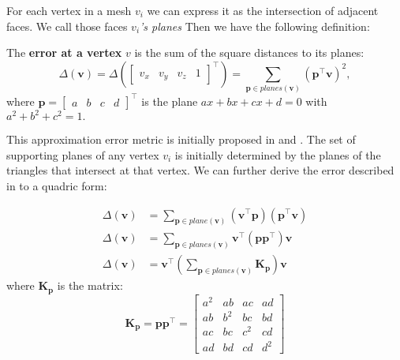 For each vertex in a mesh $v_i$ we can express it as the intersection of adjacent faces. We call those faces \emph{$v_i$'s planes} Then we have the following definition:
\begin{defn}
	The \textbf{error at a vertex} $v$ is the sum of the square distances to its planes:
	\begin{equation}
	\Delta(\textbf{v})=\Delta({\begin{bmatrix}v_x & v_y & v_z & 1\end{bmatrix}}^\intercal)=\sum_{\textbf{p}\in{planes(\textbf{v})}} (\textbf{p}^\intercal\textbf{v})^2,
	\label{QEM:ErrV}
	\end{equation}
	where $\textbf{p}={\begin{bmatrix}a & b & c & d\end{bmatrix}}^\intercal$ is the plane $ax+bx+cx+d=0$ with $a^2+b^2+c^2=1.$
\end{defn}

This approximation error metric is initially proposed in \cite{RonfardR:96} and \cite{Garland:1997:SSU}. The set of supporting planes of any vertex $v_i$ is initially determined by the planes of the triangles that intersect at that vertex. We can further derive the error described in  to a quadric form:


\begin{align}
          \Delta (\textbf{v}) &= \sum_{\textbf{p}\in plane(\textbf{v})}(\textbf{v}^\intercal \textbf{p})(\textbf{p}^\intercal \textbf{v})\\
          \Delta (\textbf{v}) &= \sum_{\textbf{p}\in planes(\textbf{v})}\textbf{v}^\intercal(\textbf{p}\textbf{p}^\intercal)\textbf{v}\\
          \Delta (\textbf{v}) &= \textbf{v}^\intercal\left(\sum_{\textbf{p}\in planes(\textbf{v})}\textbf{K}_{\textbf{p}}\right)\textbf{v}
\end{align}
where $\textbf{K}_{\textbf{p}}$ is the matrix:
$$
	\textbf{K}_{\textbf{p}}=\textbf{pp}^\intercal=
	\begin{bmatrix}
		a^2	&	ab	&	ac	&	ad\\
		ab	&	b^2	&	bc	&	bd\\
		ac	&	bc	&	c^2	&	cd\\
		ad	&	bd	&	cd	&	d^2
	\end{bmatrix}
$$

